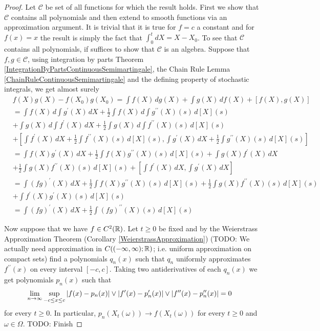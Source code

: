 \begin{proof}
Let $\mathcal{C}$ be set of all functions for which the result holds.
First we show that $\mathcal{C}$ contains all polynomials and then extend to smooth functions via an approximation argument.  It is trivial that it is true for $f=c$ a constant and for $f(x) = x$ the result is simply the fact that $\int_0^t dX = X - X_0$.  To see that $\mathcal{C}$ contains all polynomials, if suffices to show that $\mathcal{C}$ is an algebra.  Suppose that $f,g \in \mathcal{C}$, using integration by parts Theorem \ref{IntegrationByPartsContinuousSemimartingale}, the Chain Rule Lemma \ref{ChainRuleContinuousSemimartingale} and the defining property of stochastic integrals, we get almost surely
\begin{align*}
&f (X) g(X) - f(X_0) g(X_0) = \int f(X) \, dg(X) + \int g(X) \, df(X) + [f(X), g(X)] \\
&=\int f(X) \, d\int g^{\prime}(X) \, dX + \frac{1}{2} \int f(X) \, d\int g^{\prime \prime}(X)(s) \, d[X](s) \\
&+ \int g(X) \, d\int f^{\prime}(X) \, dX + \frac{1}{2} \int g(X) \, d\int f^{\prime \prime}(X)(s) \, d[X](s) \\
&+ [\int f^{\prime}(X)\, dX + \frac{1}{2}\int f^{\prime \prime}(X)(s) \, d[X](s) , \int g^{\prime} (X) \, dX + \frac{1}{2} \int g^{\prime\prime}(X)(s) \, d[X](s)] \\
&=\int f(X)  g^{\prime}(X) \, dX + \frac{1}{2} \int f(X) g^{\prime \prime}(X) (s) \, d[X](s) + \int g(X)  f^{\prime}(X) \, dX\\
&+ \frac{1}{2} \int g(X) f^{\prime \prime}(X)(s) \, d[X](s) + [\int f^{\prime}(X)\, dX , \int g^{\prime} (X) \, dX] \\
&=\int (fg)^{\prime}(X) \, dX + \frac{1}{2} \int f(X) g^{\prime \prime}(X) (s) \, d[X](s) + \frac{1}{2} \int g(X) f^{\prime \prime}(X)(s) \, d[X](s) \\
&+ \int f^{\prime}(X) g^{\prime} (X) (s) \, d[X](s) \\
&=\int (fg)^{\prime}(X) \, dX  + \frac{1}{2} \int (fg)^{\prime \prime}(X)(s) \, d[X](s) 
\end{align*}

Now suppose that we have $f \in C^2(\mathbb{R})$.  Let $t \geq 0$ be fixed and by the Weierstrass Approximation Theorem (Corollary \ref{WeierstrassApproximation}) (TODO: We actually need approximation in $C((-\infty, \infty); \mathbb{R})$; i.e. uniform approximation on compact sets) find a polynomials $q_n(x)$ such that $q_n$ uniformly approximates $f^{\prime \prime}(x)$ on every interval $[-c,c]$.  Taking two antiderivatives of each $q_n(x)$ we get polynomials $p_n(x)$ such that 
\begin{align*}
\lim_{n \to \infty} \sup_{-c \leq x \leq c} \left \vert f(x) - p_n(x) \right \vert \vee \left \vert f^{\prime}(x) - p^{\prime}_n(x) \right \vert  \vee \left \vert f^{\prime\prime}(x) - p^{\prime\prime}_n(x) \right \vert &= 0
\end{align*}
for every $t \geq 0$.  In particular, $p_n(X_t(\omega)) \to f(X_t(\omega))$ for every $t \geq 0$ and $\omega \in \Omega$.
TODO: Finish
\end{proof}

